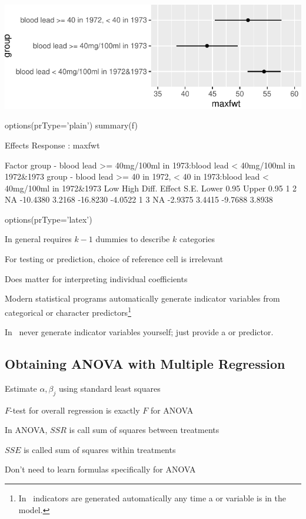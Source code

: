 \centerline{\includegraphics[width=\maxwidth]{reg-olslead-1} }


\begin{Schunk}
\begin{Sinput}
options(prType='plain')
summary(f)
\end{Sinput}
\begin{Soutput}
             Effects              Response : maxfwt 

 Factor                                                                             
 group - blood lead >= 40mg/100ml in 1973:blood lead < 40mg/100ml in 1972&1973      
 group - blood lead >= 40 in 1972, < 40 in 1973:blood lead < 40mg/100ml in 1972&1973
 Low High Diff. Effect   S.E.   Lower 0.95 Upper 0.95
 1   2    NA    -10.4380 3.2168 -16.8230   -4.0522   
 1   3    NA     -2.9375 3.4415  -9.7688    3.8938   
\end{Soutput}
\begin{Sinput}
options(prType='latex')
\end{Sinput}
\end{Schunk}
\bi
\item In general requires $k-1$ dummies to describe $k$ categories
\item For testing or prediction, choice of reference cell is
  irrelevant
\item Does matter for interpreting individual coefficients
\item Modern statistical programs automatically generate indicator
  variables from categorical or character predictors\footnote{In
    \R\ indicators are generated automatically any time a 
    or  variable is in the model.}
\item In \R\ never generate indicator variables yourself; just provide a  or  predictor.
\ei
\clearpage

\subsection{Obtaining ANOVA with Multiple Regression}
\bi
\item Estimate $\alpha, \beta_{j}$ using standard least squares
\item $F$-test for overall regression is exactly $F$ for ANOVA
\item In ANOVA, $SSR$ is call sum of squares between treatments
\item $SSE$ is called sum of squares within treatments
\item Don't need to learn formulas specifically for ANOVA
\ei

